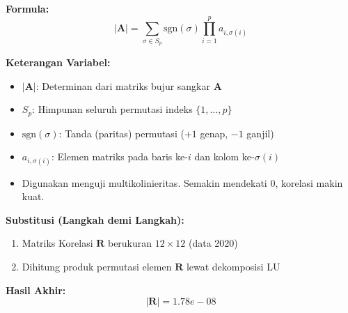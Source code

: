 \documentclass[11pt,a4paper]{article}
\begin{document}
\begin{tcolorbox}[formula_box, title={22. Determinan Matriks ($|\mathbf{A}|$)}]
\textbf{Formula:}
\[ |\mathbf{A}| = \sum_{\sigma \in S_p} \text{sgn}(\sigma) \prod_{i=1}^{p} a_{i,\sigma(i)} \]

\textbf{Keterangan Variabel:}
\begin{itemize}
  \item $|\mathbf{A}|$: Determinan dari matriks bujur sangkar $\mathbf{A}$
  \item $S_p$: Himpunan seluruh permutasi indeks $\{1, \dots, p\}$
  \item $\text{sgn}(\sigma)$: Tanda (paritas) permutasi ($+1$ genap, $-1$ ganjil)
  \item $a_{i,\sigma(i)}$: Elemen matriks pada baris ke-$i$ dan kolom ke-$\sigma(i)$
  \item Digunakan menguji multikolinieritas. Semakin mendekati 0, korelasi makin kuat.
\end{itemize}

\textbf{Substitusi (Langkah demi Langkah):}
\begin{enumerate}
  \item Matriks Korelasi $\mathbf{R}$ berukuran $12\times12$ (data 2020)
  \item Dihitung produk permutasi elemen $\mathbf{R}$ lewat dekomposisi LU
\end{enumerate}

\textbf{Hasil Akhir:}
\[ |\mathbf{R}| = 1.78e-08 \]
\end{tcolorbox}
\end{document}
